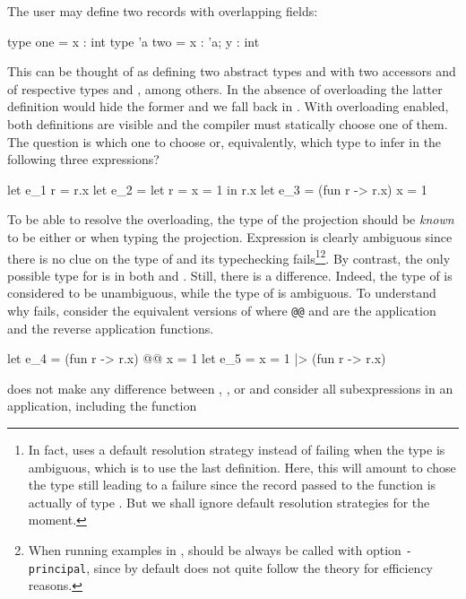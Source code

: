\documentclass[acmsmall,screen,nonacm]{acmart}
\begin{document}
The user may define two records with overlapping fields:
\begin{program}[input]
type one = {x : int}
type 'a two = {x : 'a; y : int}
\end{program}
This can be thought of as defining two abstract types  and
 with two accessors  and  of
respective types  and , among
others.
%
In the absence of overloading the latter definition would hide the former
and we fall back in \ML. With overloading enabled, both definitions are
visible and the compiler must statically choose one of them.
%
The question is which one to choose or, equivalently, which type to infer
in the following three expressions? 
\begin{program}[input]
let e_1 r = r.x
let e_2 = let r = {x = 1} in r.x
let e_3 = (fun r -> r.x) {x = 1} 
\end{program}
To be able to resolve the overloading, the type of the projection should be
\emph{known} to be either  or  when typing the
projection.  Expression  is clearly ambiguous since
there is no clue on the type of  and its typechecking
fails\footnote {In fact, \OCaml uses a default resolution strategy instead
of failing when the type is ambiguous, which is to use the last
definition. Here, this will amount to chose the type 
still leading to a failure since the record passed to the function is
actually of type . But we shall ignore default resolution
strategies for the moment.}\footnote {When running examples in \OCaml,
\OCaml should be always be called with option \texttt{-principal}, since by
default \OCaml does not quite follow the theory for efficiency reasons.}.
%
By contrast, the only possible
type for  is  in both  and .
Still, there is a difference.  Indeed, the type of  is considered
to be unambiguous, while the type of  is ambiguous. To
understand why  fails, consider the equivalent versions of
 where \texttt{@@} and \ocaml{|>} are the application and the
reverse application functions.
\begin{program}[input,escapechar={}]
let e_4 = (fun r -> r.x) @@ {x = 1} 
let e_5 = {x = 1} |> (fun r -> r.x) 
\end{program}
\OCaml  does not make any difference between
, , or 
and consider all subexpressions in an application, including the function
\end{document}
